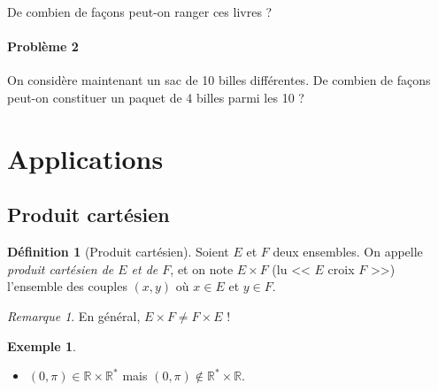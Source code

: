 \documentclass[11pt]{article}
\newcommand{\R}{\mathbb R}
\theoremstyle{definition}
\newtheorem{defn}{Définition}[section]
\newtheorem{exe}{Exemple}
\theoremstyle{remark}
\newtheorem{rem}{Remarque}
\begin{document}
De combien de façons peut-on ranger ces livres ?



\paragraph{Problème 2} On considère maintenant un sac de 10 billes différentes. De combien de façons peut-on constituer un paquet de 4 billes parmi les 10 ?

\section{Applications}

\subsection{Produit cartésien}

\begin{defn}[Produit cartésien]
Soient $E$ et $F$ deux ensembles. On appelle \textit{produit cartésien de $E$ et de $F$}, et on note $E\times F$ (lu << $E$ croix $F$ >>) l'ensemble des couples $(x,y)$ où $x\in E$ et $y\in F$.
\end{defn}

\begin{rem}
En général, $E\times F\neq F\times E$ !
\end{rem}

\begin{exe}\leavevmode
\begin{itemize}

\item $(0,\pi)\in\R\times\R^*$ mais $(0,\pi)\not\in \R^*\times\R$.
\end{itemize}
\end{exe}
\end{document}
